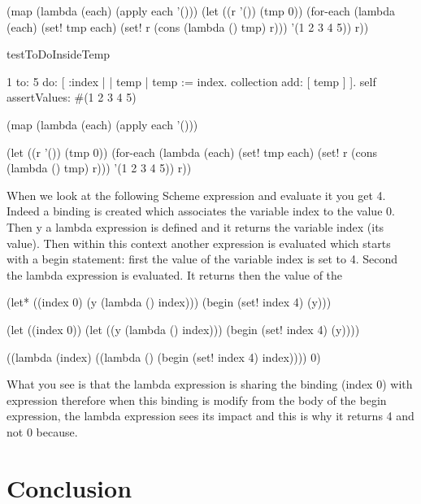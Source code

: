 \documentclass[a4paper,10pt,twoside]{book}
\begin{document}
\begin{code}{}

(map 
 (lambda (each)
   (apply each '()))
 (let ((r '()) 
       (tmp 0))
  (for-each (lambda (each)
              (set! tmp each)
              (set! r (cons (lambda () tmp) 
                            r)))
            '(1 2 3 4 5))
  r))


testToDoInsideTemp
	
	1 to: 5 do: [ :index | | temp |
		temp := index. 
		collection add: [ temp ] ].
	self assertValues: #(1 2 3 4 5)

(map 
 (lambda (each)
   (apply each '()))
 
 (let ((r '()) 
       (tmp 0))
  (for-each (lambda (each)
              (set! tmp each)
              (set! r (cons (lambda () tmp) 
                            r)))
            '(1 2 3 4 5))
  r))

\end{code}
When we look at the following Scheme expression and evaluate it you get 4. Indeed a binding is created 
which associates the variable index to the value 0. Then y a lambda expression is defined and it returns
 the variable index (its value). Then within this context another expression is evaluated which starts
with a begin statement: first the value of the variable index is set to 4. Second the lambda expression is 
evaluated. It returns then the value of the 

\begin{code}{}
(let* ((index 0)
       (y (lambda () index)))
  (begin
    (set! index 4)
    (y)))
\end{code}

\begin{code}{}
(let ((index 0))
  (let ((y (lambda () index)))
    (begin
      (set! index 4)
      (y))))
\end{code}

\begin{code}{}
((lambda (index)
   ((lambda () (begin 
                (set! index 4)
                index))))
 0)
\end{code}


What you see is that the lambda expression is sharing the binding (index 0) with expression 
therefore when this binding is modify from the body of the begin expression, the lambda expression sees its impact
and this is why it returns 4 and not 0 because. 


\section{Conclusion}
\end{document}
